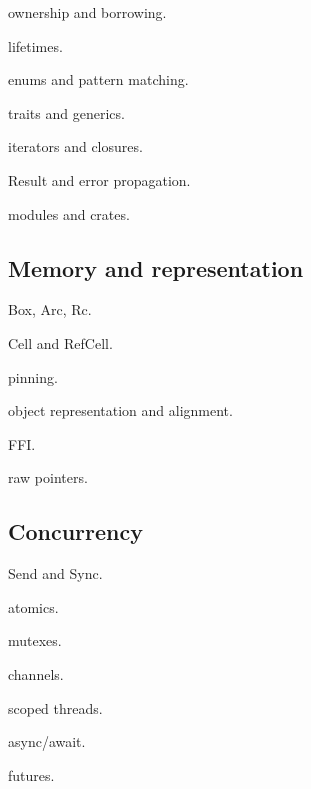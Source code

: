 \documentclass[11pt,letterpaper]{article}
\begin{document}
\begin{topics}

\item ownership and borrowing.

\item lifetimes.

\item enums and pattern matching.

\item traits and generics.

\item iterators and closures.

\item Result and error propagation.

\item modules and crates.

\end{topics}

\subsection*{Memory and representation}

\begin{topics}

\item Box, Arc, Rc.

\item Cell and RefCell.

\item pinning.

\item object representation and alignment.

\item FFI.

\item raw pointers.

\end{topics}

\subsection*{Concurrency}

\begin{topics}

\item Send and Sync.

\item atomics.

\item mutexes.

\item channels.

\item scoped threads.

\item async/await.

\item futures.

\end{topics}
\end{document}
